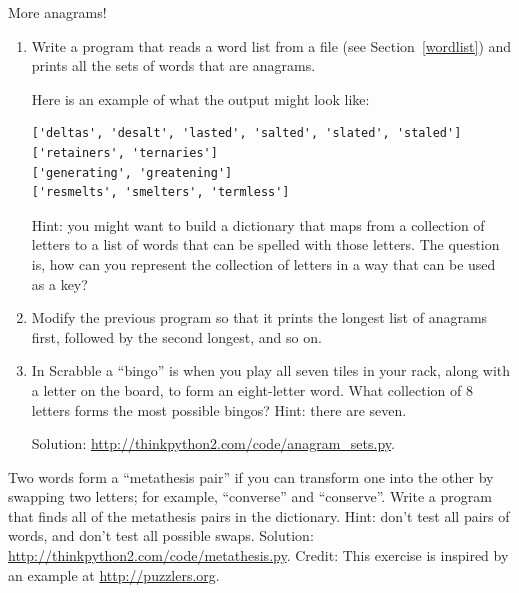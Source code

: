 \begin{exercise}
\label{anagrams}

More anagrams!

\begin{enumerate}

\item Write a program
that reads a word list from a file (see Section~\ref{wordlist}) and
prints all the sets of words that are anagrams.

Here is an example of what the output might look like:

\begin{lstlisting}
['deltas', 'desalt', 'lasted', 'salted', 'slated', 'staled']
['retainers', 'ternaries']
['generating', 'greatening']
['resmelts', 'smelters', 'termless']
\end{lstlisting}
%
Hint: you might want to build a dictionary that maps from a
collection of letters to a list of words that can be spelled with those
letters.  The question is, how can you represent the collection of
letters in a way that can be used as a key?

\item Modify the previous program so that it prints the longest list
of anagrams first, followed by the second longest, and so on.

\item In Scrabble a ``bingo'' is when you play all seven tiles in
your rack, along with a letter on the board, to form an eight-letter
word.  What collection of 8 letters forms the most possible bingos?
Hint: there are seven.


Solution: \url{http://thinkpython2.com/code/anagram_sets.py}.

\end{enumerate}
\end{exercise}

\begin{exercise}

Two words form a ``metathesis pair'' if you can transform one into the
other by swapping two letters; for example, ``converse'' and
``conserve''.  Write a program that finds all of the metathesis pairs
in the dictionary.  Hint: don't test all pairs of words, and don't
test all possible swaps.  Solution:
\url{http://thinkpython2.com/code/metathesis.py}.  Credit: This
exercise is inspired by an example at \url{http://puzzlers.org}.

\end{exercise}


